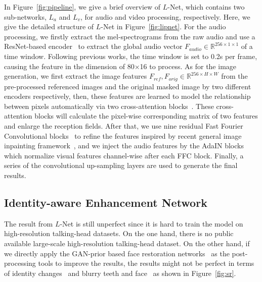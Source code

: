 In Figure~\ref{fig:pipeline}, we give a brief overview of $L$-Net, which contains two sub-networks, ${L}_{a}$ and ${L}_{v}$, for audio and video processing, respectively. 
Here, we give the detailed structure of ${L}$-Net in Figure~\ref{fig:lipnet}.
For the audio processing, we firstly extract the mel-spectrograms from the raw audio and use a ResNet-based encoder~\cite{resnet} to extract the global audio vector $F_{audio}\in\mathbb{R}^{256 \times 1 \times 1}$ of a time window. 
Following previous works, the time window is set to 0.2s per frame, causing the feature in the dimension of 80$\times$16 to process.
As for the image generation, we first extract the image features $F_{ref}, F_{orig}\in\mathbb{R}^{256 \times H \times W}$ from the pre-processed referenced images and the original masked image by two different encoders respectively, then, these features are learned to model the relationship between pixels automatically via two cross-attention blocks~\cite{attention}. These cross-attention blocks will calculate the pixel-wise corresponding matrix of two features and enlarge the reception fields. After that, we use nine residual Fast Fourier Convolutional blocks~\cite{ffc} to refine the features inspired by recent general image inpainting framework~\cite{lama}, and we inject the audio features by the AdaIN blocks~\cite{huang2017adain} which normalize visual features channel-wise after each FFC block. Finally, a series of the convolutional up-sampling layers are used to generate the final results.



\subsection{Identity-aware Enhancement Network}
\label{sec:enhance}
The result from ${L}$-Net is still unperfect since it is hard to train the model on high-resolution talking-head datasets. On the one hand, there is no public available large-scale high-resolution talking-head dataset. 
On the other hand, if we directly apply the GAN-prior based face restoration networks~\cite{gfpgan, gpen} as the post-processing tools to improve the results, the results might not be perfect in terms of identity changes~\cite{gfpgan} and blurry teeth and face~\cite{gpen} as shown in Figure~\ref{fig:sr}. 

